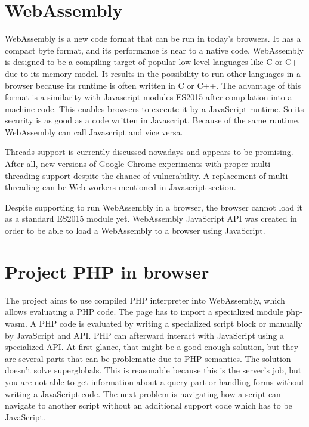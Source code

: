\section{WebAssembly}

WebAssembly  is a new code format that can be run in today's browsers. 
It has a compact byte format, and its performance is near to a native code. 
WebAssembly is designed to be a compiling target of popular low-level languages like C or C++ due to its memory model.
It results in the possibility to run other languages in a browser because its runtime is often written in C or C++. 
The advantage of this format is a similarity with Javascript modules ES2015 after compilation into a machine code. 
This enables browsers to execute it by a JavaScript runtime. 
So its security is as good as a code written in Javascript. 
Because of the same runtime, WebAssembly can call Javascript and vice versa.
\par
Threads  support is currently discussed nowadays and appears to be promising.
After all, new versions of Google Chrome experiments with proper multi-threading support despite the chance of vulnerability.
A replacement of multi-threading can be Web workers mentioned in Javascript section.
\par
Despite supporting to run WebAssembly in a browser, the browser cannot load it as a standard ES2015 module yet.
WebAssembly JavaScript API was created in order to be able to load a WebAssembly to a browser using JavaScript.

\section{Project PHP in browser}

The project  aims to use compiled PHP interpreter into WebAssembly, which allows evaluating a PHP code.
The page has to import a specialized module php-wasm. 
A PHP code is evaluated by writing a specialized script block or manually by JavaScript and API.
PHP can afterward interact with JavaScript using a specialized API.
At first glance, that might be a good enough solution, but they are several parts that can be problematic due to PHP semantics.
The solution doesn't solve superglobals. 
This is reasonable because this is the server's job, but you are not able to get information about a query part or handling forms without writing a JavaScript code.
The next problem is navigating how a script can navigate to another script without an additional support code which has to be JavaScript.

